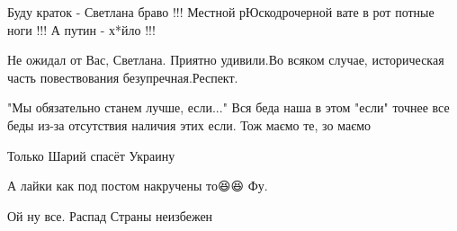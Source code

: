 \begin{itemize}
 
Буду краток - Светлана браво !!! Местной рЮскодрочерной вате в рот потные ноги !!! А путин - х*йло !!!

 
Не ожидал от Вас, Светлана. Приятно удивили.Во всяком случае, историческая часть повествования безупречная.Респект.

 
"Мы обязательно станем лучше, если..."
Вся беда наша в этом "если" точнее все беды из-за отсутствия наличия этих если. Тож маємо те, зо маємо

 
Только Шарий спасёт Украину 🎈🎈🎈🎈🎈🎈🎈🎈🎈🎈🎈🎈🎈🎈🎈🎈🎈🎈🎈🎈🎈🎈🎈🎈🎈🎈🎈🎈🎈🎈🎈🎈🎈🎈🎈🎈🎈🎈🎈🎈🎈🎈🎈🎈🎈🎈🎈🎈🎈🎈🎈🎈🎈

 
А лайки как под постом накручены то😆😆 Фу.

 
Ой ну все. Распад Страны неизбежен \Smiley[1.0][yellow]

 

\end{itemize}
